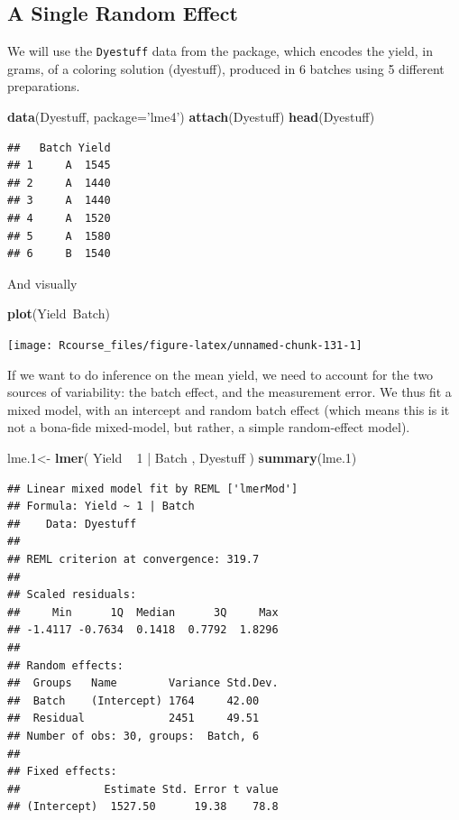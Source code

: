\documentclass[]{book}
\newenvironment{Shaded}{\begin{snugshade}}{\end{snugshade}}
\newcommand{\KeywordTok}[1]{\textcolor[rgb]{0.13,0.29,0.53}{\textbf{{#1}}}}
\newcommand{\DataTypeTok}[1]{\textcolor[rgb]{0.13,0.29,0.53}{{#1}}}
\newcommand{\DecValTok}[1]{\textcolor[rgb]{0.00,0.00,0.81}{{#1}}}
\newcommand{\FloatTok}[1]{\textcolor[rgb]{0.00,0.00,0.81}{{#1}}}
\newcommand{\StringTok}[1]{\textcolor[rgb]{0.31,0.60,0.02}{{#1}}}
\newcommand{\NormalTok}[1]{{#1}}
\theoremstyle{definition}
\theoremstyle{definition}
\theoremstyle{remark}
\begin{document}
\subsection{A Single Random Effect}\label{a-single-random-effect}

We will use the \texttt{Dyestuff} data from the package, which encodes
the yield, in grams, of a coloring solution (dyestuff), produced in 6
batches using 5 different preparations.

\begin{Shaded}
\begin{Highlighting}[]
\KeywordTok{data}\NormalTok{(Dyestuff, }\DataTypeTok{package=}\StringTok{'lme4'}\NormalTok{)}
\KeywordTok{attach}\NormalTok{(Dyestuff)}
\KeywordTok{head}\NormalTok{(Dyestuff)}
\end{Highlighting}
\end{Shaded}

\begin{verbatim}
##   Batch Yield
## 1     A  1545
## 2     A  1440
## 3     A  1440
## 4     A  1520
## 5     A  1580
## 6     B  1540
\end{verbatim}

And visually

\begin{Shaded}
\begin{Highlighting}[]
\KeywordTok{plot}\NormalTok{(Yield~Batch)}
\end{Highlighting}
\end{Shaded}

\texttt{[image: Rcourse\_files/figure-latex/unnamed-chunk-131-1]}

If we want to do inference on the mean yield, we need to account for the
two sources of variability: the batch effect, and the measurement error.
We thus fit a mixed model, with an intercept and random batch effect
(which means this is it not a bona-fide mixed-model, but rather, a
simple random-effect model).

\begin{Shaded}
\begin{Highlighting}[]
\NormalTok{lme}\FloatTok{.1}\NormalTok{<-}\StringTok{ }\KeywordTok{lmer}\NormalTok{( Yield ~}\StringTok{ }\DecValTok{1}  \NormalTok{|}\StringTok{ }\NormalTok{Batch  , Dyestuff )}
\KeywordTok{summary}\NormalTok{(lme}\FloatTok{.1}\NormalTok{)}
\end{Highlighting}
\end{Shaded}

\begin{verbatim}
## Linear mixed model fit by REML ['lmerMod']
## Formula: Yield ~ 1 | Batch
##    Data: Dyestuff
## 
## REML criterion at convergence: 319.7
## 
## Scaled residuals: 
##     Min      1Q  Median      3Q     Max 
## -1.4117 -0.7634  0.1418  0.7792  1.8296 
## 
## Random effects:
##  Groups   Name        Variance Std.Dev.
##  Batch    (Intercept) 1764     42.00   
##  Residual             2451     49.51   
## Number of obs: 30, groups:  Batch, 6
## 
## Fixed effects:
##             Estimate Std. Error t value
## (Intercept)  1527.50      19.38    78.8
\end{verbatim}
\end{document}
